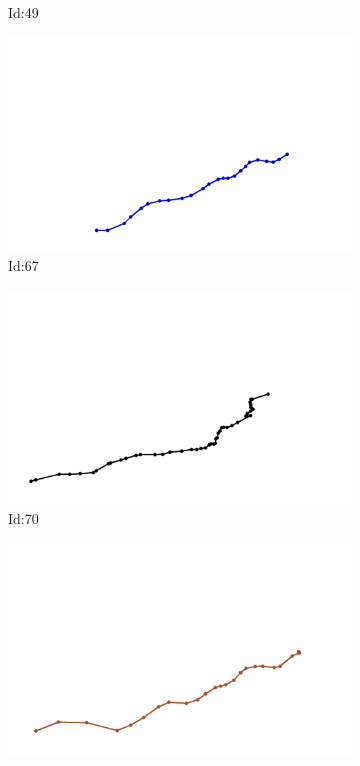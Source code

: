 \documentclass[12pt,twoside]{report}
\begin{document}
\begin{figure}
\begin{subfigure}[b]{0.20\textwidth}
\caption{Id:49}
\end{subfigure}
\begin{subfigure}[b]{0.20\textwidth}
\centering
\includegraphics[width=\textwidth]{../trajectories/67.png}
\caption{Id:67}
\end{subfigure}
\begin{subfigure}[b]{0.20\textwidth}
\centering
\includegraphics[width=\textwidth]{../trajectories/70.png}
\caption{Id:70}
\end{subfigure}
\begin{subfigure}[b]{0.20\textwidth}
\centering
\includegraphics[width=\textwidth]{../trajectories/72.png}

\end{subfigure}
\end{figure}
\end{document}
